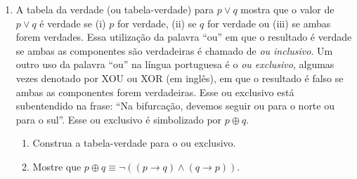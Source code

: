 \documentclass[12pt,a4paper,oneside]{article}
\begin{document}
\begin{enumerate}
	\item A tabela da verdade (ou tabela-verdade) para $p \vee q$ mostra que o valor de $p \vee q$ é verdade se (i) $p$ for verdade, (ii) se $q$ for verdade ou (iii) se ambas forem verdades. Essa utilização da palavra ``ou'' em que o resultado é verdade se ambas as componentes são verdadeiras é chamado de {\it ou inclusivo}. Um outro uso da palavra ``ou'' na língua portuguesa é o {\it ou exclusivo}, algumas vezes denotado por XOU ou XOR (em inglês), em que o resultado é falso se ambas as componentes forem verdadeiras. Esse ou exclusivo está subentendido na frase: ``Na bifurcação, devemos seguir ou para o norte ou para o sul''. Esse ou exclusivo é simbolizado por $p \oplus q$.
	
		\begin{enumerate}
			\item Construa a tabela-verdade para o ou exclusivo.
			\item Mostre que $p \oplus q \equiv \neg ((p \rightarrow q) \wedge (q \rightarrow p))$.
		\end{enumerate}
	
%	
%		
%		
%		
%		
	
\end{enumerate}
\end{document}
